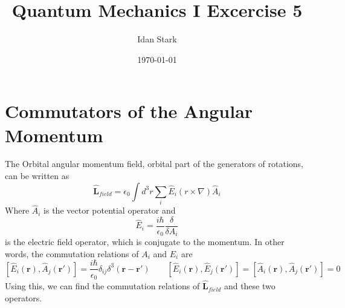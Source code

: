 \documentclass{article}
\title{Quantum Mechanics I Excercise 5}
\author{Idan Stark}
\date{\today}
\begin{document}
\maketitle
\section{Commutators of the Angular Momentum}
The Orbital angular momentum field, orbital part of the generators of rotations, can be written as
\begin{equation}
    \hat{\boldsymbol{L}}_{field} = \epsilon_0 \int d^3 r \sum_i \hat{E}_i \left(r \times \nabla\right)\hat{A}_i
\end{equation}
Where $\hat{A}_i$ is the vector potential operator and
\begin{equation}
    \hat{E}_i = \frac{i\hbar}{\epsilon_0}\frac{\delta}{\delta A_i}
\end{equation}
is the electric field operator, which is conjugate to the momentum. In other words, the commutation relations of $A_i$ and $E_i$ are
\begin{equation}
\label{eq:commutation-relations-l-e}
    \left[\hat{E}_i(\boldsymbol{r}), \hat{A}_j(\boldsymbol{r'})\right] = \frac{i\hbar}{\epsilon_0}\delta_{ij}\delta^3(\boldsymbol{r} - \boldsymbol{r'})
    \qquad
    \left[\hat{E}_i(\boldsymbol{r}), \hat{E}_j(\boldsymbol{r'})\right] =
    \left[\hat{A}_i(\boldsymbol{r}), \hat{A}_j(\boldsymbol{r'})\right] = 0
\end{equation}
Using this, we can find the commutation relations of $\hat{\boldsymbol{L}}_{field}$ and these two operators.
\end{document}
